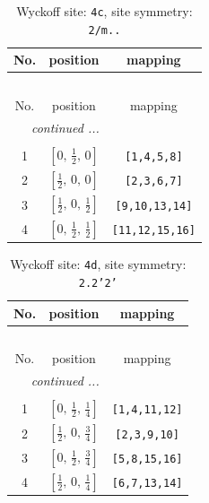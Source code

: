 \documentclass[fleqn,8pt]{jsarticle}
\begin{document}
\renewcommand{\arraystretch}{1.2}
\begin{longtable}{ccc}
\caption{Wyckoff site: {\tt 4c}, site symmetry: {\tt 2/m..}}
 \\
 \hline \hline
No. & position & mapping \\ \hline \endfirsthead

\multicolumn{2}{l}{\tablename\ \thetable{}} \\
 \hline \hline
No. & position & mapping \\ \hline \endhead

 \hline \hline
\multicolumn{2}{r}{\footnotesize\it continued ...} \\ \endfoot

 \hline \hline
\multicolumn{2}{r}{} \\ \endlastfoot

1 & $\left[ 0,\, \frac{1}{2},\, 0 \right]$ & {\tt [1,4,5,8]} \\ \hline
2 & $\left[ \frac{1}{2},\, 0,\, 0 \right]$ & {\tt [2,3,6,7]} \\ \hline
3 & $\left[ \frac{1}{2},\, 0,\, \frac{1}{2} \right]$ & {\tt [9,10,13,14]} \\ \hline
4 & $\left[ 0,\, \frac{1}{2},\, \frac{1}{2} \right]$ & {\tt [11,12,15,16]} \\
\end{longtable}
\renewcommand{\arraystretch}{1.2}
\begin{longtable}{ccc}
\caption{Wyckoff site: {\tt 4d}, site symmetry: {\tt 2.2'2'}}
 \\
 \hline \hline
No. & position & mapping \\ \hline \endfirsthead

\multicolumn{2}{l}{\tablename\ \thetable{}} \\
 \hline \hline
No. & position & mapping \\ \hline \endhead

 \hline \hline
\multicolumn{2}{r}{\footnotesize\it continued ...} \\ \endfoot

 \hline \hline
\multicolumn{2}{r}{} \\ \endlastfoot

1 & $\left[ 0,\, \frac{1}{2},\, \frac{1}{4} \right]$ & {\tt [1,4,11,12]} \\ \hline
2 & $\left[ \frac{1}{2},\, 0,\, \frac{3}{4} \right]$ & {\tt [2,3,9,10]} \\ \hline
3 & $\left[ 0,\, \frac{1}{2},\, \frac{3}{4} \right]$ & {\tt [5,8,15,16]} \\ \hline
4 & $\left[ \frac{1}{2},\, 0,\, \frac{1}{4} \right]$ & {\tt [6,7,13,14]} \\
\end{longtable}
\end{document}
